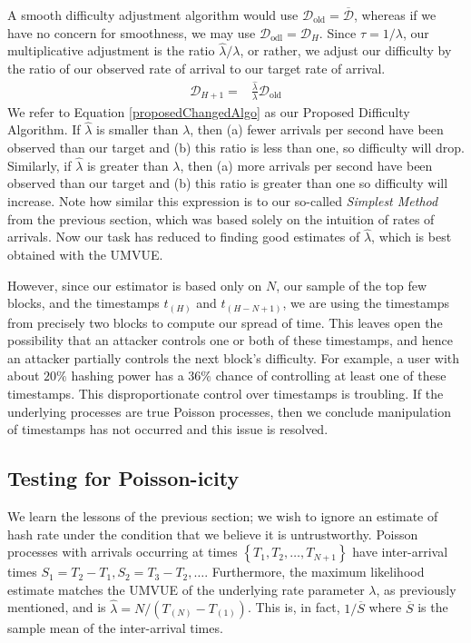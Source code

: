 \documentclass[12pt,english]{mrl}
\theoremstyle{definition}
\numberwithin{equation}{section}
\numberwithin{figure}{section}
\numberwithin{equation}{section}
\numberwithin{equation}{section}
\numberwithin{figure}{section}
\begin{document}
A smooth difficulty adjustment algorithm would use $\mathcal{D}_\text{old} = \overline{\mathcal{D}}$, whereas if we have no concern for smoothness, we may use $\mathcal{D}_{\text{odl}} = \mathcal{D}_H$.  Since $\tau = 1/\lambda$, our multiplicative adjustment is the ratio $\widehat{\lambda}/\lambda$, or rather, we adjust our difficulty by the ratio of our observed rate of arrival to our target rate of arrival. 
\begin{align}\label{proposedChangedAlgo}
\mathcal{D}_{H+1} =& \frac{\widehat{\lambda}}{\lambda} \mathcal{D}_{\text{old}} 
\end{align}
We refer to Equation \ref{proposedChangedAlgo} as our Proposed Difficulty Algorithm. If $\hat{\lambda}$ is smaller than $\lambda$, then (a) fewer arrivals per second have been observed than our target and (b) this ratio is less than one, so difficulty will drop. Similarly, if $\hat{\lambda}$ is greater than $\lambda$, then (a) more arrivals per second have been observed than our target and (b) this ratio is greater than one so difficulty will increase. Note how similar this expression is to our so-called \textit{Simplest Method} from the previous section, which was based solely on the intuition of rates of arrivals.  Now our task has reduced to finding good estimates of $\hat{\lambda}$, which is best obtained with the UMVUE.


However, since our estimator is based only on $N$, our sample of the top few blocks, and the timestamps $t_{(H)}$ and $t_{(H-N+1)}$, we are using the timestamps from precisely two blocks to compute our spread of time. This leaves open the possibility that an attacker controls one or both of these timestamps, and hence an attacker partially controls the next block's difficulty. For example, a user with about $20\%$ hashing power has a $36\%$ chance of controlling at least one of these timestamps. This disproportionate control over timestamps is troubling. If the underlying processes are true Poisson processes, then we conclude manipulation of timestamps has not occurred and this issue is resolved.

\subsection{Testing for Poisson-icity}
We learn the lessons of the previous section; we wish to ignore an estimate of hash rate under the condition that we believe it is untrustworthy.  Poisson processes with arrivals occurring at times $\left\{T_1, T_2, \ldots, T_{N+1}\right\}$ have inter-arrival times $S_{1} = T_2 - T_1, S_2 = T_3 - T_2, \ldots$. Furthermore, the maximum likelihood estimate matches the UMVUE of the underlying rate parameter $\lambda$, as previously mentioned, and is $\hat{\lambda} = N/(T_{(N)} - T_{(1)})$. This is, in fact, $1/\overline{S}$ where $\overline{S}$ is the sample mean of the inter-arrival times.
\end{document}

